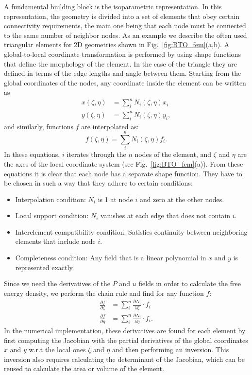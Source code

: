 A fundamental building block is the isoparametric representation.
In this representation, the geometry is divided into a set of elements that obey certain connectivity requirements, the main one being that each node must be connected to the same number of neighbor nodes.
As an example we describe the often used triangular elements for 2D geometries shown in Fig.~\ref{fig:BTO_fem}(a,b).
A global-to-local coordinate transformation is performed by using shape functions that define the morphology of the element.
In the case of the triangle they are defined in terms of the edge lengths and angle between them. 
Starting from the global coordinates of the nodes, any coordinate inside the element can be written as
\begin{align}
x(\zeta, \eta) &= \sum_i^n N_i(\zeta, \eta) x_i\\
y(\zeta, \eta) &= \sum_i^n N_i(\zeta, \eta) y_i,
\end{align}
and similarly, functions $f$ are interpolated as:
\begin{equation}
	\label{eq:BTO_funcinterp}
	f(\zeta, \eta) = \sum_i^n N_i(\zeta, \eta) f_i.
\end{equation}
In these equations, $i$ iterates through the $n$ nodes of the element, and $\zeta$ and $\eta$ are the axes of the local coordinate system (see Fig.~\ref{fig:BTO_fem}(a)).
From these equations it is clear that each node has a separate shape function.
They have to be chosen in such a way that they adhere to certain conditions:
\begin{itemize}
	\item Interpolation condition: $N_i$ is 1 at node $i$ and zero at the other nodes.
	\item Local support condition: $N_i$ vanishes at each edge that does not contain $i$.
	\item Interelement compatibility condition: Satisfies continuity between neighboring elements that include node $i$.
	\item Completeness condition: Any field that is a linear polynomial in $x$ and $y$ is represented exactly.
\end{itemize}

Since we need the derivatives of the $P$ and $u$ fields in order to calculate the free energy density, we perform the chain rule and find for any function $f$:
\begin{align}
	\label{eq:BTO_derivatives}
	\frac{\partial f}{\partial \zeta} &= \sum_i^n \frac{\partial N_i}{\partial \zeta} \cdot f_i \\
	\frac{\partial f}{\partial \eta}  &= \sum_i^n \frac{\partial N_i}{\partial \eta} \cdot f_i.
\end{align}
In the numerical implementation, these derivatives are found for each element by first computing the Jacobian with the partial derivatives of the global coordinates $x$ and $y$ w.r.t the local ones $\zeta$ and $\eta$ and then performing an inversion.
This inversion also requires calculating the determinant of the Jacobian, which can be reused to calculate the area or volume of the element.

